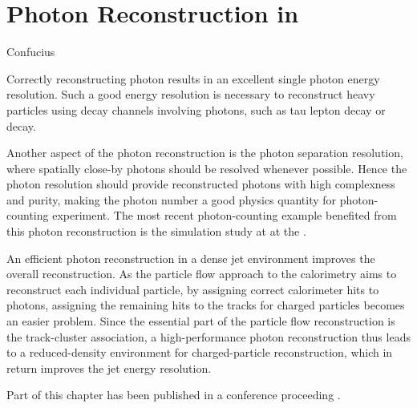 \chapter{Photon Reconstruction in \pandora}
\label{chap:Photon}

%
{Confucius}


Correctly reconstructing photon results in an excellent single photon energy resolution. Such a good energy resolution  is  necessary to reconstruct heavy particles using decay channels involving photons, such as tau lepton decay or \Ppizero decay.

Another aspect of the photon reconstruction is the photon separation resolution, where spatially close-by  photons should be resolved whenever possible. Hence the photon resolution should provide reconstructed photons with high complexness and purity, making the photon number a good physics quantity for photon-counting experiment. The most recent photon-counting  example benefited from this photon reconstruction is the  \HepProcess{\PHiggs \to \Pgamma \Pgamma} simulation study at  at the \CLIC \cite{Kacarevic:higgsToGammaGamma}.

An efficient photon reconstruction in a dense jet environment improves the overall reconstruction. As the particle flow approach to the calorimetry aims to reconstruct each individual particle, by assigning correct calorimeter hits to photons, assigning the remaining hits to the tracks for charged particles becomes an easier problem. Since the essential part of the particle flow reconstruction is the track-cluster association,  a high-performance photon reconstruction thus leads to a reduced-density environment for charged-particle reconstruction, which in return improves the jet energy resolution.


Part of this chapter has been published in a conference proceeding \cite{Xu:2016rcz}.




